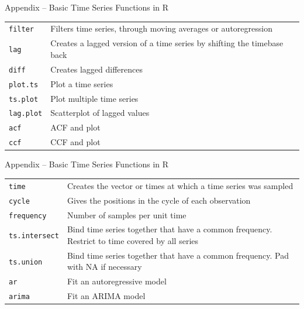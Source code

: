 \documentclass[ignorenonframetext,xcolor=x11names]{beamer}
\begin{document}


\begin{frame}[label=withcode]{Appendix -- Basic Time Series Functions in R}
\footnotesize
\renewcommand{\arraystretch}{1.25}
\begin{tabularx}{\textwidth}{l|X} \hline
\texttt{filter} & Filters time series, through moving averages or autoregression \\
\texttt{lag} & Creates a lagged version of a time series by shifting the timebase back \\
\texttt{diff} & Creates lagged differences \\ 
\texttt{plot.ts} & Plot a time series \\
\texttt{ts.plot} & Plot multiple time series \\
\texttt{lag.plot} & Scatterplot of lagged values \\
\texttt{acf} & ACF and plot \\
\texttt{ccf} & CCF and plot \\ \hline
\end{tabularx}
\end{frame}

\begin{frame}[label=withcode]{Appendix -- Basic Time Series Functions in R}
\footnotesize
\renewcommand{\arraystretch}{1.25}
\begin{tabularx}{\textwidth}{l|X} \hline
\texttt{time} & Creates the vector or times at which a time series was sampled \\
\texttt{cycle} & Gives the positions in the cycle of each observation \\
\texttt{frequency} & Number of samples per unit time \\
\texttt{ts.intersect} & Bind time series together that have a common frequency. Restrict to time covered by all series \\
\texttt{ts.union} & Bind time series together that have a common frequency. Pad with NA if necessary \\ 
\texttt{ar} & Fit an autoregressive model \\ 
\texttt{arima} & Fit an ARIMA model \\ \hline
\end{tabularx}
\end{frame}
\end{document}
